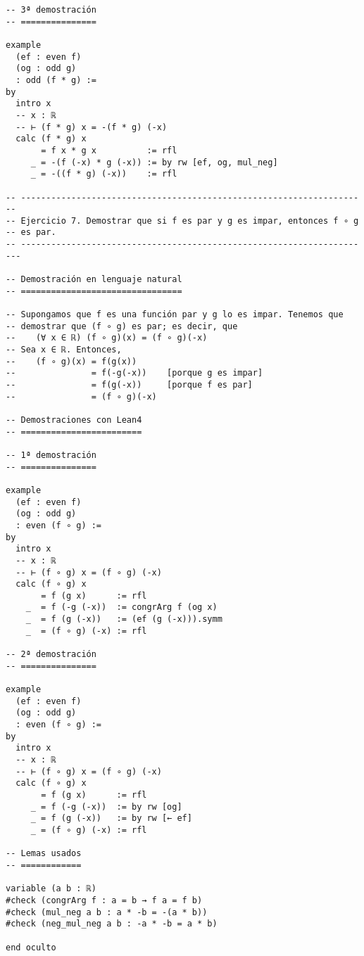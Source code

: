 \begin{verbatim}
-- 3ª demostración
-- ===============

example
  (ef : even f)
  (og : odd g)
  : odd (f * g) :=
by
  intro x
  -- x : ℝ
  -- ⊢ (f * g) x = -(f * g) (-x)
  calc (f * g) x
       = f x * g x          := rfl
     _ = -(f (-x) * g (-x)) := by rw [ef, og, mul_neg]
     _ = -((f * g) (-x))    := rfl

-- ---------------------------------------------------------------------
-- Ejercicio 7. Demostrar que si f es par y g es impar, entonces f ∘ g
-- es par.
-- ----------------------------------------------------------------------

-- Demostración en lenguaje natural
-- ================================

-- Supongamos que f es una función par y g lo es impar. Tenemos que
-- demostrar que (f ∘ g) es par; es decir, que
--    (∀ x ∈ ℝ) (f ∘ g)(x) = (f ∘ g)(-x)
-- Sea x ∈ ℝ. Entonces,
--    (f ∘ g)(x) = f(g(x))
--               = f(-g(-x))    [porque g es impar]
--               = f(g(-x))     [porque f es par]
--               = (f ∘ g)(-x)

-- Demostraciones con Lean4
-- ========================

-- 1ª demostración
-- ===============

example
  (ef : even f)
  (og : odd g)
  : even (f ∘ g) :=
by
  intro x
  -- x : ℝ
  -- ⊢ (f ∘ g) x = (f ∘ g) (-x)
  calc (f ∘ g) x
       = f (g x)      := rfl
    _  = f (-g (-x))  := congrArg f (og x)
    _  = f (g (-x))   := (ef (g (-x))).symm
    _  = (f ∘ g) (-x) := rfl

-- 2ª demostración
-- ===============

example
  (ef : even f)
  (og : odd g)
  : even (f ∘ g) :=
by
  intro x
  -- x : ℝ
  -- ⊢ (f ∘ g) x = (f ∘ g) (-x)
  calc (f ∘ g) x
       = f (g x)      := rfl
     _ = f (-g (-x))  := by rw [og]
     _ = f (g (-x))   := by rw [← ef]
     _ = (f ∘ g) (-x) := rfl

-- Lemas usados
-- ============

variable (a b : ℝ)
#check (congrArg f : a = b → f a = f b)
#check (mul_neg a b : a * -b = -(a * b))
#check (neg_mul_neg a b : -a * -b = a * b)

end oculto
\end{verbatim}


